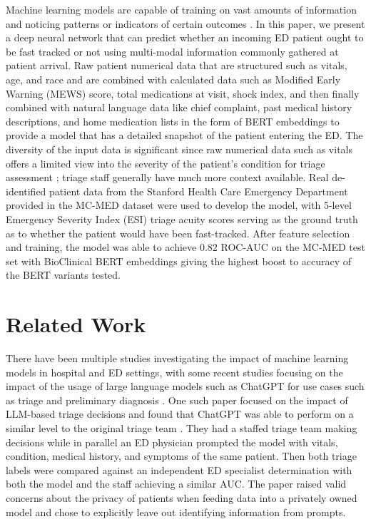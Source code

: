 \documentclass[sigconf]{acmart}
\begin{document}
Machine learning models are capable of training on vast amounts of information and noticing patterns or indicators of certain outcomes \cite{Rajkomar2019,Topol2019}. In this paper, we present a deep neural network that can predict whether an incoming ED patient ought to be fast tracked or not using multi-modal information commonly gathered at patient arrival. Raw patient numerical data that are structured such as vitals, age, and race and are combined with calculated data such as Modified Early Warning (MEWS) score, total medications at visit, shock index, and then finally combined with natural language data like chief complaint, past medical history descriptions, and home medication lists in the form of BERT embeddings to provide a model that has a detailed snapshot of the patient entering the ED. The diversity of the input data is significant since raw numerical data such as vitals offers a limited view into the severity of the patient's condition for triage assessment \cite{christ2010modern}; triage staff generally have much more context available. Real de-identified patient data from the Stanford Health Care Emergency Department provided in the MC-MED dataset \cite{Kansal2025} were used to develop the model, with 5-level Emergency Severity Index (ESI) triage acuity scores serving as the ground truth as to whether the patient would have been fast-tracked. After feature selection and training, the model was able to achieve 0.82 ROC-AUC on the MC-MED test set with BioClinical BERT \cite{alsentzer2019publiclyavailableclinicalbert} embeddings giving the highest boost to accuracy of the BERT variants tested.

\section{Related Work}
There have been multiple studies investigating the impact of machine learning models in hospital and ED settings, with some recent studies focusing on the impact of the usage of large language models such as ChatGPT for use cases such as triage and preliminary diagnosis \cite{wang2025preliminary, BERG202483, PASLI2024170}. 
One such paper focused on the impact of LLM-based triage decisions and found that ChatGPT was able to perform on a similar level to the original triage team \cite{PASLI2024170}. They had a staffed triage team making decisions while in parallel an ED physician prompted the model with vitals, condition, medical history, and symptoms of the same patient. Then both triage labels were compared against an independent ED specialist determination with both the model and the staff achieving a similar AUC. The paper raised valid concerns about the privacy of patients when feeding data into a privately owned model and chose to explicitly leave out identifying information from prompts.
\end{document}
